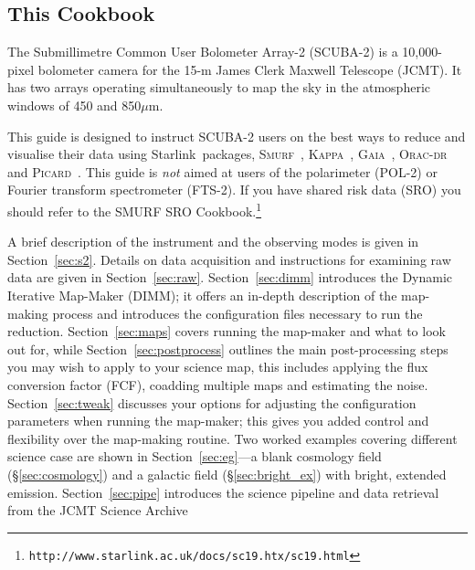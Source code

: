 \documentclass[twoside,11pt]{article}
\newcommand{\htmladdnormallink}[2]{#1}
\newcommand{\htmlref}[2]{#1}
\newenvironment{latexonly}{}{}
\newcommand{\latex}[1]{#1}
\newcommand{\latexhtml}[2]{#1}
\newcommand{\xref}[3]{#1}
\newcommand{\xlabel}[1]{}
\renewcommand{\_}{\texttt{\symbol{95}}}
\newcommand{\starlink}{\htmladdnormallink{Starlink}{http://starlink.jach.hawaii.edu}}
\newcommand{\gaia}{\xref{\textsc{Gaia}}{sun214}{}}
\newcommand{\Kappa}{\xref{\textsc{Kappa}}{sun95}{}}
\newcommand{\oracdr}{\htmladdnormallink{\textsc{Orac-dr}}{http://www.oracdr.org/oracdr}}
\newcommand{\picard}{\xref{\textsc{Picard}}{sun265}{}}
\newcommand{\smurf}{\xref{\textsc{Smurf}}{sun258}{}}
\newcommand{\cref}[3]{\latexhtml{#1~\ref{#2}}{\htmlref{#3}{#2}}}
\begin{document}
\subsection{\xlabel{using_guide}This Cookbook}

The Submillimetre Common User Bolometer Array-2 (SCUBA-2) is a
10,000-pixel bolometer camera for the 15-m James Clerk Maxwell
Telescope (JCMT). It has two arrays operating simultaneously to map
the sky in the atmospheric windows of 450 and 850$\mu$m.

This guide is designed to instruct SCUBA-2 users on the best ways to
reduce and visualise their data using \starlink\ packages,
\smurf\ \cite{smurf}, \Kappa\ \cite{kappa}, \gaia\ \cite{gaia}, \oracdr\ \cite{oracdr} and \picard\
\cite{picard}. This guide is {\em not} aimed at users of the
polarimeter (POL-2) or Fourier transform spectrometer (FTS-2). If you
have shared risk data (SRO) you should refer to the
\xref{SMURF SRO
Cookbook.}{sc19}{}\latex{\footnote{\texttt{http://www.starlink.ac.uk/docs/sc19.htx/sc19.html}}}

A brief description of the instrument and the observing modes is given
in \cref{Section}{sec:s2}{an Overview}. Details on data acquisition and
instructions for examining raw data are given in
\cref{Section}{sec:raw}{Raw SCUBA-2 data}.
\cref{Section}{sec:dimm}{This page} introduces the Dynamic Iterative Map-Maker
(DIMM); it offers an in-depth description of the map-making
process and introduces the configuration files necessary to run the
reduction. \cref{Section}{sec:maps}{Reducing your Data} covers running 
the map-maker and what to look out for, while
\cref{Section}{sec:postprocess}{Post-processing Reduction Steps}
outlines the main post-processing steps you may wish to apply to your
science map, this includes applying the flux conversion
factor (FCF), coadding multiple maps and estimating the noise.
\cref{Section}{sec:tweak}{Tweaking the configuration file}
discusses your options for adjusting the configuration
parameters when running the map-maker; this gives you added control
and flexibility over the map-making routine. Two worked examples
covering different science case are shown in
\cref{Section}{sec:eg}{Examples}---a
\htmlref{blank cosmology field}{sec:cosmology}
\begin{latexonly}
(\S\ref{sec:cosmology})
\end{latexonly}
and a \htmlref{galactic field}{sec:bright_ex}
\begin{latexonly}
(\S\ref{sec:bright_ex})
\end{latexonly}
with bright, extended emission.
\cref{Section}{sec:pipe}{SCUBA-2 Pipeline} introduces the science
pipeline and data retrieval from the
\htmladdnormallink{JCMT Science Archive}{http://www3.cadc-ccda.hia-iha.nrc-cnrc.gc.ca/jcmt/}
\end{document}
